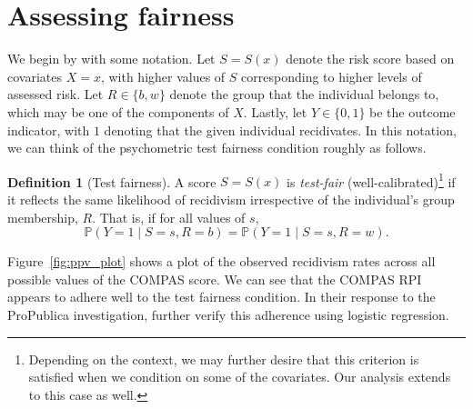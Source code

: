 \documentclass[11pt, svgnames, twocolumn]{article}
\newcommand{\R}{\mathbb{R}}
\renewcommand{\P}{\mathbb{P}}
\numberwithin{equation}{section}
\theoremstyle{plain}
\theoremstyle{definition}
\newtheorem{definition}{Definition}
\numberwithin{theorem}{section}
\numberwithin{prop}{section}
\numberwithin{corollary}{section}
\numberwithin{definition}{section}
\begin{document}
  \vspace{-0.25em}
\section{Assessing fairness}
\vspace{-0.25em}

We begin by with some notation.  Let $S = S(x)$ denote the risk score based on covariates $X = x$, with higher values of $S$ corresponding to higher levels of assessed risk.  Let $R \in \{b, w\}$ denote the group that the individual belongs to, which may be one of the components of $X$.  Lastly, let $Y \in \{0 , 1\}$ be the outcome indicator, with $1$ denoting that the given individual recidivates.  
  In this notation, we can think of the psychometric test fairness condition roughly as follows. 
 
 \begin{definition}[Test fairness]
   A score $S = S(x)$ is  \emph{test-fair} (well-calibrated)\footnote{Depending on the context, we may further desire that this criterion is satisfied when we condition on some of the covariates.  Our analysis extends to this case as well.}   if it reflects the same likelihood of recidivism irrespective of the individual's group membership, $R$. That is, if for all values of $s$,
   \begin{equation}
   \P(Y = 1 \mid S = s, R = b) = \P(Y = 1 \mid S = s, R = w).
   \label{def:testfair}
   \end{equation}
   
 \end{definition}
 
 Figure~\ref{fig:ppv_plot} shows a plot of the observed recidivism rates across all possible values of the COMPAS score.  We can see that the COMPAS RPI appears to adhere well to the test fairness condition.   In their response to the ProPublica investigation, \citet{floresfalse} further verify this adherence using logistic regression.
 
\end{document}
